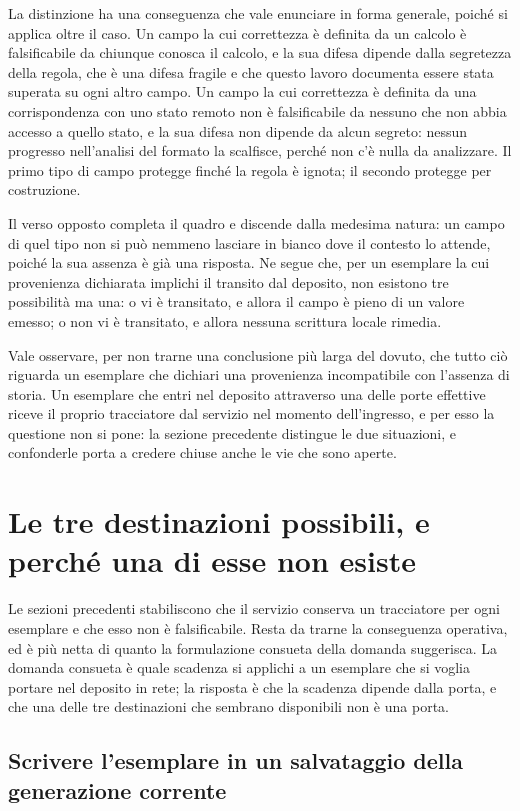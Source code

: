 La distinzione ha una conseguenza che vale enunciare in forma generale, poiché si applica oltre il caso. Un campo la cui correttezza è definita da un calcolo è falsificabile da chiunque conosca il calcolo, e la sua difesa dipende dalla segretezza della regola, che è una difesa fragile e che questo lavoro documenta essere stata superata su ogni altro campo. Un campo la cui correttezza è definita da una corrispondenza con uno stato remoto non è falsificabile da nessuno che non abbia accesso a quello stato, e la sua difesa non dipende da alcun segreto: nessun progresso nell'analisi del formato la scalfisce, perché non c'è nulla da analizzare. Il primo tipo di campo protegge finché la regola è ignota; il secondo protegge per costruzione.

Il verso opposto completa il quadro e discende dalla medesima natura: un campo di quel tipo non si può nemmeno lasciare in bianco dove il contesto lo attende, poiché la sua assenza è già una risposta. Ne segue che, per un esemplare la cui provenienza dichiarata implichi il transito dal deposito, non esistono tre possibilità ma una: o vi è transitato, e allora il campo è pieno di un valore emesso; o non vi è transitato, e allora nessuna scrittura locale rimedia.

Vale osservare, per non trarne una conclusione più larga del dovuto, che tutto ciò riguarda un esemplare che dichiari una provenienza incompatibile con l'assenza di storia. Un esemplare che entri nel deposito attraverso una delle porte effettive riceve il proprio tracciatore dal servizio nel momento dell'ingresso, e per esso la questione non si pone: la sezione precedente distingue le due situazioni, e confonderle porta a credere chiuse anche le vie che sono aperte.

\section{Le tre destinazioni possibili, e perché una di esse non esiste}

Le sezioni precedenti stabiliscono che il servizio conserva un tracciatore per ogni esemplare e che esso non è falsificabile. Resta da trarne la conseguenza operativa, ed è più netta di quanto la formulazione consueta della domanda suggerisca. La domanda consueta è quale scadenza si applichi a un esemplare che si voglia portare nel deposito in rete; la risposta è che la scadenza dipende dalla porta, e che una delle tre destinazioni che sembrano disponibili non è una porta.

\subsection*{Scrivere l'esemplare in un salvataggio della generazione corrente}

